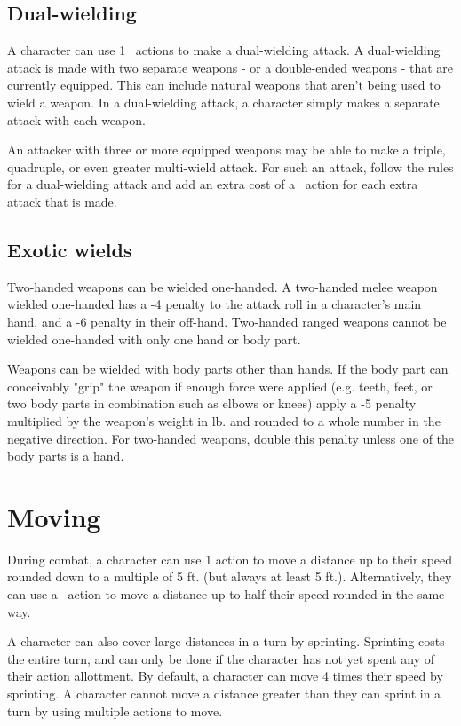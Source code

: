 \begin{multicols*}{2}
    \subsection{Dual-wielding}\label{combat:dual-wielding}
    A character can use 1 \textonehalf\ actions to make a dual-wielding
    attack. A dual-wielding attack is made with two separate weapons - or a
    double-ended weapons - that are currently equipped. This can include
    natural weapons that aren't being used to wield a weapon. In a
    dual-wielding attack, a character simply makes a separate attack with each
    weapon.

    An attacker with three or more equipped weapons may be able to make a
    triple, quadruple, or even greater multi-wield attack. For such an attack,
    follow the rules for a dual-wielding attack and add an extra cost of a
    \textonehalf\ action for each extra attack that is made.

    \subsection{Exotic wields}
    Two-handed weapons can be wielded one-handed. A two-handed melee weapon
    wielded one-handed has a -4 penalty to the attack roll in a character's
    main hand, and a -6 penalty in their off-hand. Two-handed ranged weapons
    cannot be wielded one-handed with only one hand or body part.

    Weapons can be wielded with body parts other than hands. If the body part
    can conceivably "grip" the weapon if enough force were applied (e.g. teeth,
    feet, or two body parts in combination such as elbows or knees) apply a -5
    penalty multiplied by the weapon's weight in lb. and rounded to a whole
    number in the negative direction. For two-handed weapons, double this
    penalty unless one of the body parts is a hand.

    \section{Moving}\label{combat:moving}
    During combat, a character can use 1 action to move a distance up to their
    speed rounded down to a multiple of 5 ft. (but always at least 5 ft.).
    Alternatively, they can use a \textonehalf\ action to move a distance up
    to half their speed rounded in the same way.

    A character can also cover large distances in a turn by sprinting.
    Sprinting costs the entire turn, and can only be done if the character has
    not yet spent any of their action allottment. By default, a character can
    move 4 times their speed by sprinting. A character cannot move a distance
    greater than they can sprint in a turn by using multiple actions to move.



\end{multicols*}
